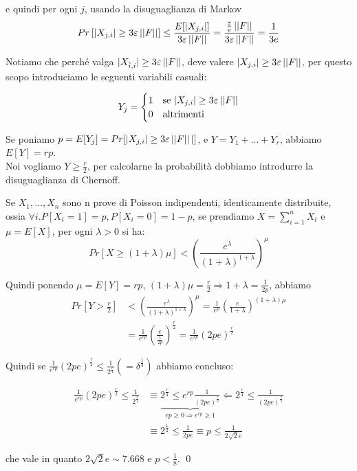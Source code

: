 \begin{proof*}
    e quindi per ogni $j$, usando la disuguaglianza di Markov
    \[
        Pr\left[|X_{j, i}| \ge 3\varepsilon\left|\left|F\right|\right|\right] \le
            \frac{E[|X_{j,i}|]}{3\varepsilon\left|\left|F\right|\right|} 
        = \frac{\frac{\varepsilon}{e} \left|\left|F\right|\right|}{3\varepsilon\left|\left|F\right|\right|}
        = \frac{1}{3e}
    \]

    Notiamo che perché valga $|X_{\hat{i}, i}| \ge 3\varepsilon\left|\left|F\right|\right|$,
    deve valere $|X_{j, i}| \ge 3\varepsilon\left|\left|F\right|\right|$, per questo scopo
    introduciamo le seguenti variabili casuali:

    \[
        Y_j = 
        \begin{cases}
            1 & \mbox{se } |X_{j, i}| \ge 3\varepsilon\left|\left|F\right|\right| \\
            0 & \mbox{altrimenti}
        \end{cases}
    \]

    Se poniamo $p = E[Y_j] = Pr[|X_{j,i}| \ge 3 \varepsilon\left|\left|F\right|\right||]$,
    e $Y = Y_1 + \dots + Y_r$, abbiamo $E[Y] = rp$. \\
    Noi vogliamo $Y \ge \frac{r}{2}$, per calcolarne la probabilità dobbiamo
    introdurre la disuguaglianza di Chernoff.

    \begin{definition*}
        Se $X_1, \dots, X_n$ sono n prove di Poisson indipendenti, identicamente
        distribuite, ossia $\forall i. P[X_i = 1] = p, P[X_i = 0] = 1-p$, se
        prendiamo $X=\sum_{i=1}^n X_i$ e $\mu = E[X]$, per ogni $\lambda > 0$ si ha:
        \[ Pr\left[X \ge (1+\lambda)\mu\right] <
            \left(\frac{e^\lambda}{(1+\lambda)^{1+\lambda}}\right)^\mu\]
    \end{definition*}

    Quindi ponendo $\mu = E[Y] = rp$, $(1+\lambda)\mu = \frac{r}{2} \Rightarrow
    1+\lambda = \frac{1}{2p}$, abbiamo
    \begin{align*}
        Pr\left[Y > \frac{r}{2}\right] &< \left(\frac{e^\lambda}{(1+\lambda)^{1+\lambda}}\right)^\mu
        = \frac{1}{e^\mu}\left(\frac{e}{1+\lambda}\right)^{(1+\lambda)\mu} \\
        &= \frac{1}{e^{rp}}\left(\frac{e}{\frac{1}{2p}}\right)^{\frac{r}{2}}
        = \frac{1}{e^{rp}}(2pe)^{\frac{r}{2}}
    \end{align*}

    Quindi se $\frac{1}{e^{rp}}(2pe)^{\frac{r}{2}} \le \frac{1}{2^{\frac{r}{4}}} (= \delta^{\frac{1}{4}})$
    abbiamo concluso:

    \begin{align*}
        \frac{1}{e^{rp}}(2pe)^{\frac{r}{2}} \le \frac{1}{2^{\frac{r}{4}}}
        & \equiv \underbrace{2^{\frac{r}{4}} \le e^{rp} \frac{1}{(2pe)^{\frac{r}{2}}}}
            _{rp \ge 0 \Rightarrow e^{rp} \ge 1}
        \Leftarrow 2^{\frac{r}{4}} \le \frac{1}{(2pe)^{\frac{r}{2}}} \\
        & \equiv 2^{\frac{1}{2}} \le \frac{1}{2pe}
        \equiv p \le \frac{1}{2\sqrt{2}e}
    \end{align*}

    che vale in quanto $2\sqrt{2}e\sim 7.668$ e $p < \frac{1}{8}$. \qed
\end{proof*}